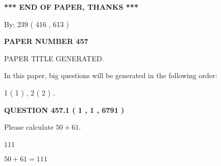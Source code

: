 \documentclass[12pt]{article}
\begin{document}
   
\vspace{1.0in} 
{\textbf{\large{ *** END OF PAPER, THANKS *** }}} 
   
   
\hspace{1.0in} By: 
 239 ( 416 ,  613 )
   
   
   
   
\newpage 
\setcounter{page}{ 
   457001 } 
   
   
   
   
 {\textbf{ \Large{ PAPER NUMBER  457  }}}
   
   
\vspace{0.2in}
   
   
   
   
   
   
   
   
 \vspace{0.2in}
 
 
 
 
   
   
 PAPER TITLE GENERATED.
   
   
   
\vspace{0.2in}
   
In this paper, big questions will be generated in the following order: 
   
   
   1 ( 1 )
 ,
   2 ( 2 )
 .
  
\vspace{0.2in}
  
{\textbf{\Large{QUESTION
457.1 
 ( 1 , 1 , 6791 )
}}}
  
  
 
Please calculate $ %
50 +  %
61 $.
 
 
 
\noindent{}
 
 

111
 
 
\noindent{}
 
 

 
 
 
\noindent{}
 
 

$ %
50 +  %
61=   %
111$
 
\end{document}
